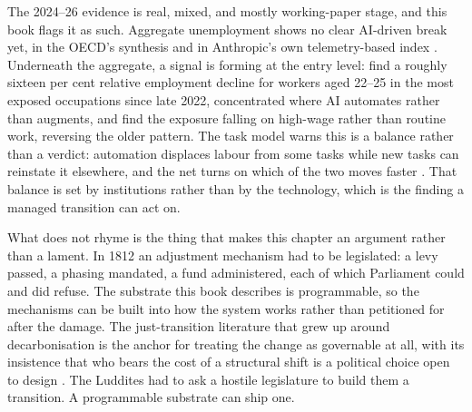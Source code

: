 \begin{evidencebox}[title={Early Signals, Read as Preliminary}]
The 2024--26 evidence is real, mixed, and mostly working-paper stage, and this book flags it as such. Aggregate unemployment shows no clear AI-driven break yet, in the OECD's synthesis and in Anthropic's own telemetry-based index \parencite{OECD2023,AnthropicLabor2026}. Underneath the aggregate, a signal is forming at the entry level: \textcite{Brynjolfsson2025Canaries} find a roughly sixteen per cent relative employment decline for workers aged 22--25 in the most exposed occupations since late 2022, concentrated where AI automates rather than augments, and \textcite{Hampole2025} find the exposure falling on high-wage rather than routine work, reversing the older pattern. The task model warns this is a balance rather than a verdict: automation displaces labour from some tasks while new tasks can reinstate it elsewhere, and the net turns on which of the two moves faster \parencite{Acemoglu2019,Autor2015}. That balance is set by institutions rather than by the technology, which is the finding a managed transition can act on.
\end{evidencebox}

What does not rhyme is the thing that makes this chapter an argument rather than a lament. In 1812 an adjustment mechanism had to be legislated: a levy passed, a phasing mandated, a fund administered, each of which Parliament could and did refuse. The substrate this book describes is programmable, so the mechanisms can be built into how the system works rather than petitioned for after the damage. The just-transition literature that grew up around decarbonisation is the anchor for treating the change as governable at all, with its insistence that who bears the cost of a structural shift is a political choice open to design \parencite{ILO2015,NewellMulvaney2013,AutorMindellReynolds2022}. The Luddites had to ask a hostile legislature to build them a transition. A programmable substrate can ship one.

